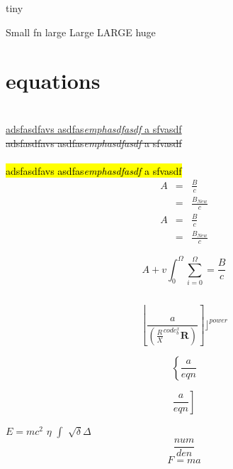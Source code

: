 {\tiny{tiny}}

{
\small{Small}
\footnotesize{fn}
\large{large}
\Large{Large}
\LARGE{LARGE}}
{\huge{huge}
}
\section{equations}
\color{red!40!black!10!blue}{\blindtext}
\\
\ul{adsfasdfavs asdfas\emph{emphasdfasdf} a sfvasdf}\\
\st{adsfasdfavs asdfas\emph{emphasdfasdf} a sfvasdf}\\
\\
\hl{adsfasdfavs asdfas\emph{emphasdfasdf} a sfvasdf}\\

\begin{eqnarray}
A&=&\frac{B}{c}      \nonumber\\
&=&\frac{B_{New}}{c}\label{eqn:11}\\
A&=&\frac{B}{c}\nonumber\\
&=&\frac{B_{New}}{c}\label{eqn:12}
\end{eqnarray}

\begin{equation}
A+v\int_{0}^{\Omega} \sum_{i=0}^{\Omega}=\frac{B}{c}
\label{eq:2}
\end{equation}

\[
\]

\begin{equation}
\left\lfloor
\frac{a}{
\left(\frac{R}{X}^{code_b^x} \mathbf{R} 
\right)}
\right]\rfloor^{power}
\label{eq:2}
\end{equation}


\begin{equation}
\left\{\frac{a}{eqn}\right.
\label{eq:2}
\end{equation}


\begin{equation}
\left.\frac{a}{eqn}\right]
\label{eq:2}
\end{equation}


\doublespacing
\textbf{\blindtext}
\textit{\blindtext}
$E=mc^2$ $\eta$ $\int$ ${\sqrt\delta\Delta}$
$$\frac{num}{den}$$
\singlespacing
\onehalfspacing
\begin{equation}
F=ma
\label{eq:force}
\end{equation}



